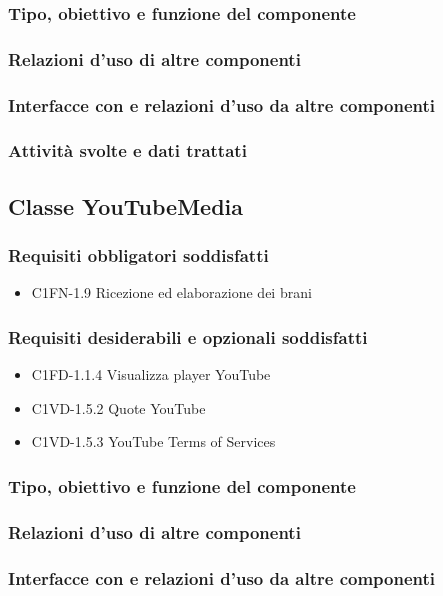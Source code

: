 \subsubsection*{Tipo, obiettivo e funzione del componente}
\subsubsection*{Relazioni d'uso di altre componenti}
\subsubsection*{Interfacce con e relazioni d'uso da altre componenti}
\subsubsection*{Attivit\`a svolte e dati trattati}

\subsection{Classe YouTubeMedia}
\subsubsection*{Requisiti obbligatori soddisfatti}
\begin{itemize}
    \item C1FN-1.9 Ricezione ed elaborazione dei brani
\end{itemize}
\subsubsection*{Requisiti desiderabili e opzionali soddisfatti}
\begin{itemize}
    \item C1FD-1.1.4 Visualizza player YouTube
    \item C1VD-1.5.2 Quote YouTube
    \item C1VD-1.5.3 YouTube Terms of Services
\end{itemize}
\subsubsection*{Tipo, obiettivo e funzione del componente}
\subsubsection*{Relazioni d'uso di altre componenti}
\subsubsection*{Interfacce con e relazioni d'uso da altre componenti}
